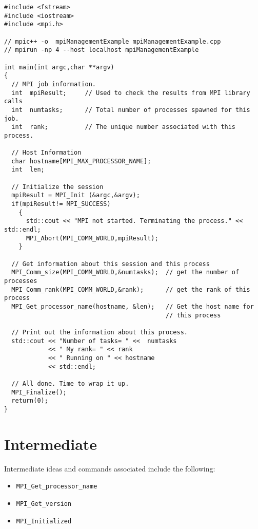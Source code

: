 \lstset{language=C++, numbers=left, numberstyle=\tiny, stepnumber=1,
  numbersep=5pt, commentstyle=\scriptsize}
\begin{lstlisting}[caption={Basic Process Information},
                   basicstyle=\scriptsize,
                   label=listing:basicProcess]
#include <fstream>
#include <iostream>
#include <mpi.h>

// mpic++ -o  mpiManagementExample mpiManagementExample.cpp 
// mpirun -np 4 --host localhost mpiManagementExample

int main(int argc,char **argv)
{
  // MPI job information.
  int  mpiResult;     // Used to check the results from MPI library calls
  int  numtasks;      // Total number of processes spawned for this job.
  int  rank;          // The unique number associated with this process.

  // Host Information 
  char hostname[MPI_MAX_PROCESSOR_NAME];
  int  len;

  // Initialize the session
  mpiResult = MPI_Init (&argc,&argv);
  if(mpiResult!= MPI_SUCCESS)
    {
      std::cout << "MPI not started. Terminating the process." << std::endl;
      MPI_Abort(MPI_COMM_WORLD,mpiResult);
    }

  // Get information about this session and this process 
  MPI_Comm_size(MPI_COMM_WORLD,&numtasks);  // get the number of processes
  MPI_Comm_rank(MPI_COMM_WORLD,&rank);      // get the rank of this process
  MPI_Get_processor_name(hostname, &len);   // Get the host name for
                                            // this process

  // Print out the information about this process.
  std::cout << "Number of tasks= " <<  numtasks
            << " My rank= " << rank
            << " Running on " << hostname
            << std::endl;

  // All done. Time to wrap it up.
  MPI_Finalize();
  return(0);
}
\end{lstlisting}



\section{Intermediate}

\todo Intermediate ideas and commands associated include the following: \\
\begin{itemize}
\item \texttt{MPI\_Get\_processor\_name}
\item \texttt{MPI\_Get\_version}
\item \texttt{MPI\_Initialized}
\end{itemize}

